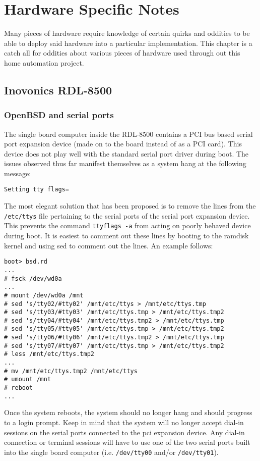 \chapter{Hardware Specific Notes}
Many pieces of hardware require knowledge of certain quirks and oddities to be able to deploy said hardware into a
particular implementation.  This chapter is a catch all for oddities about various pieces of hardware used through out
this home automation project.

\section{Inovonics RDL-8500}


\subsection{OpenBSD and serial ports}
The single board computer inside the RDL-8500 contains a PCI bus based serial port expansion device (made on to the
board instead of as a PCI card).  This device does not play well with the standard serial port driver during boot.  The
issues observed thus far manifest themselves as a system hang at the following message:
\begin{verbatim}
Setting tty flags=
\end{verbatim}
The most elegant solution that has been proposed is to remove the lines from the \verb=/etc/ttys= file pertaining to the
serial ports of the serial port expansion device.  This prevents the command \verb=ttyflags -a= from acting on poorly
behaved device during boot.  It is easiest to comment out these lines by booting to the ramdisk kernel and using sed to
comment out the lines.  An example follows:
\begin{verbatim}
boot> bsd.rd
...
# fsck /dev/wd0a
...
# mount /dev/wd0a /mnt
# sed 's/tty02/#tty02' /mnt/etc/ttys > /mnt/etc/ttys.tmp
# sed 's/tty03/#tty03' /mnt/etc/ttys.tmp > /mnt/etc/ttys.tmp2
# sed 's/tty04/#tty04' /mnt/etc/ttys.tmp2 > /mnt/etc/ttys.tmp
# sed 's/tty05/#tty05' /mnt/etc/ttys.tmp > /mnt/etc/ttys.tmp2
# sed 's/tty06/#tty06' /mnt/etc/ttys.tmp2 > /mnt/etc/ttys.tmp
# sed 's/tty07/#tty07' /mnt/etc/ttys.tmp > /mnt/etc/ttys.tmp2
# less /mnt/etc/ttys.tmp2
...
# mv /mnt/etc/ttys.tmp2 /mnt/etc/ttys
# umount /mnt
# reboot
...
\end{verbatim}
Once the system reboots, the system should no longer hang and should progress to a login prompt.  Keep in mind that the
system will no longer accept dial-in sessions on the serial ports connected to the pci expansion device.  Any dial-in
connection or terminal sessions will have to use one of the two serial ports built into the single board computer (i.e.
\verb=/dev/tty00= and/or \verb=/dev/tty01=).

